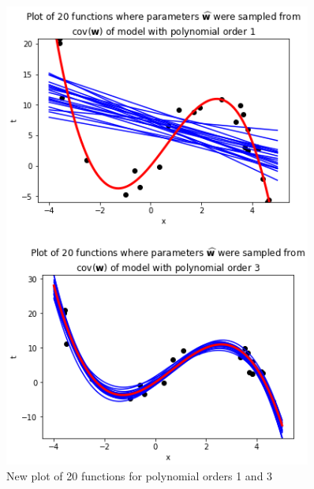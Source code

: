 \documentclass[10pt]{article}
\begin{document}
\begin{itemize}
\begin{figure}
\centering
\includegraphics[width=0.9\textwidth]{6a.png}
\caption{\label{fig:7}New plot of 20 functions for polynomial orders 1 and 3}
\end{figure}


\end{itemize}
\end{document}
